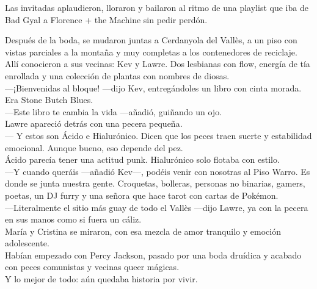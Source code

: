 Las invitadas aplaudieron, lloraron y bailaron al ritmo de una playlist que iba de Bad Gyal a Florence + the Machine sin pedir perdón.\\

\saltescena

Después de la boda, se mudaron juntas a Cerdanyola del Vallès, a un piso con vistas parciales a la montaña y muy completas a los contenedores de reciclaje.\\

Allí conocieron a sus vecinas: Kev y Lawre. Dos lesbianas con flow, energía de tía enrollada y una colección de plantas con nombres de diosas.\\

—¡Bienvenidas al bloque! —dijo Kev, entregándoles un libro con cinta morada.\\

Era Stone Butch Blues.\\

—Este libro te cambia la vida —añadió, guiñando un ojo.\\

Lawre apareció detrás con una pecera pequeña.\\

— Y estos son Ácido e Hialurónico. Dicen que los peces traen suerte y estabilidad emocional. Aunque bueno, eso depende del pez.\\

Ácido parecía tener una actitud punk. Hialurónico solo flotaba con estilo.\\

—Y cuando queráis —añadió Kev—, podéis venir con nosotras al Piso Warro. Es donde se junta nuestra gente. Croquetas, bolleras, personas no binarias, gamers, poetas, un DJ furry y una señora que hace tarot con cartas de Pokémon.\\

—Literalmente el sitio más guay de todo el Vallès —dijo Lawre, ya con la pecera en sus manos como si fuera un cáliz.\\

María y Cristina se miraron, con esa mezcla de amor tranquilo y emoción adolescente.\\

Habían empezado con Percy Jackson, pasado por una boda druídica y acabado con peces comunistas y vecinas queer mágicas.\\

Y lo mejor de todo: aún quedaba historia por vivir.

\setlength{\parindent}{20pt}
